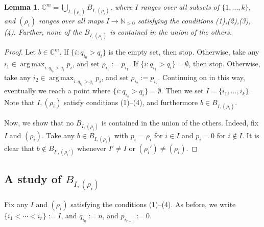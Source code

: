 \documentclass[12pt,psamsfonts]{article}
\DeclareMathOperator*{\argmax}{arg\,max}
\newtheorem{lemma}[theorem]{Lemma}
\begin{document}
\begin{lemma}\label{bs_union}
    \(\mathbb{C}^m = \bigcup_{I, (\rho_i)} B_{I, (\rho_i)}\), where \(I\) ranges over all subsets of \(\{1, ..., k\}\), and \((\rho_i)\) ranges over all maps \(I \to \mathbb{N}_{>0}\) satisfying the conditions (1),(2),(3),(4).
    Further, none of the \(B_{I, (\rho_i)}\) is contained in the union of the others.
\end{lemma}
\begin{proof}
    Let \(b \in \mathbb{C}^m\).
    If \(\{i : q_{i_0} > q_i\}\) is the empty set, then stop.
    Otherwise, take any \(i_1 \in \argmax_{i : q_{i_0} > q_i} p_i\), and set \(\rho_{i_1} := p_{i_1}\).
    If \(\{i : q_{i_1} > q_i\} = \emptyset\), then stop.
    Otherwise, take any \(i_2 \in \argmax_{i : q_{i_1} > q_i} p_i\), and set \(\rho_{i_2} := p_{i_2}\).
    Continuing on in this way, eventually we reach a point where \(\{i : q_{i_k} > q_i\} = \emptyset\).
    Then we set \(I = \{i_1, ..., i_k\}\).
    Note that \(I, (\rho_i)\) satisfy conditions (1)--(4), and furthermore \(b \in B_{I, (\rho_i)}\).
    \par Now, we show that no \(B_{I, (\rho_i)}\) is contained in the union of the others.
    Indeed, fix \(I\) and \((\rho_i)\).
    Take any \(b \in B_{I, (\rho_i)}\) with \(p_i = \rho_i\) for \(i \in I\) and \(p_i = 0\) for \(i \notin I\).
    It is clear that \(b \notin B_{I', (\rho_i')}\) whenever \(I' \neq I\) or \((\rho_i') \neq (\rho_i)\).
\end{proof}

\subsection{A study of \(B_{I, (\rho_i)}\)}
Fix any \(I\) and \((\rho_i)\) satisfying the conditions (1)--(4).
As before, we write \(\{i_1 < \cdots < i_r\} := I\), and \(q_{i_0} := n\), and \(p_{i_{r + 1}} := 0\).
\end{document}
